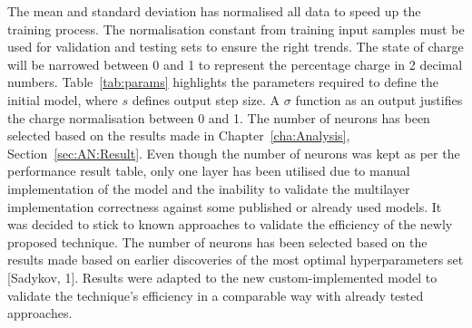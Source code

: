 %
%
The mean and standard deviation has normalised all data to speed up the training process.
The normalisation constant from training input samples must be used for validation and testing sets to ensure the right trends.
The state of charge will be narrowed between 0 and 1 to represent the percentage charge in 2 decimal numbers.
\mbox{Table~\ref{tab:params}} highlights the parameters required to define the initial model, where $s$ defines output step size.
A $\sigma$ function as an output justifies the charge normalisation between 0 and 1.
{
    The number of neurons has been selected based on the results made in Chapter~\ref{cha:Analysis}, Section~\ref{sec:AN:Result}.
    Even though the number of neurons was kept as per the performance result table, only one layer has been utilised due to manual implementation of the model and the inability to validate the multilayer implementation correctness against some published or already used models.
    It was decided to stick to known approaches to validate the efficiency of the newly proposed technique.
} {
    The number of neurons has been selected based on the results made based on earlier discoveries of the most optimal hyperparameters set [Sadykov, 1].
    Results were adapted to the new custom-implemented model to validate the technique's efficiency in a comparable way with already tested approaches.
}
\begin{table}[ht]
    \renewcommand{\arraystretch}{1.3}
    \caption{Model structure and parameters}
    \centering
    \label{tab:params}
\end{table}

